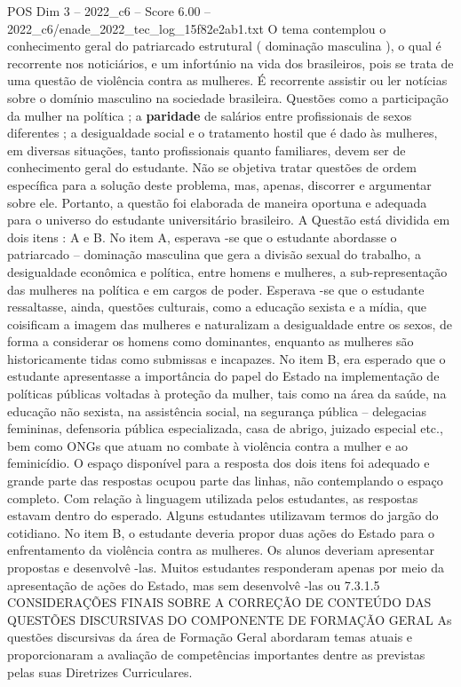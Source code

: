 \begin{textsample}{POS Dim 3 – 2022\_c6 – Score 6.00 – 2022\_c6/enade\_2022\_tec\_log\_15f82e2ab1.txt}
O tema contemplou o conhecimento geral do patriarcado estrutural ( dominação masculina ), o qual é recorrente nos noticiários, e um infortúnio na vida dos brasileiros, pois se trata de uma questão de violência contra as mulheres.
É recorrente assistir ou ler notícias sobre o domínio masculino na sociedade brasileira.
Questões como a participação da mulher na política ; a \textbf{paridade} de salários entre profissionais de sexos diferentes ; a desigualdade social e o tratamento hostil que é dado às mulheres, em diversas situações, tanto profissionais quanto familiares, devem ser de conhecimento geral do estudante.
Não se objetiva tratar questões de ordem específica para a solução deste problema, mas, apenas, discorrer e argumentar sobre ele.
Portanto, a questão foi elaborada de maneira oportuna e adequada para o universo do estudante universitário brasileiro.
A Questão está dividida em dois itens : A e B.
No item A, esperava -se que o estudante abordasse o patriarcado – dominação masculina que gera a divisão sexual do trabalho, a desigualdade econômica e política, entre homens e mulheres, a sub-representação das mulheres na política e em cargos de poder.
Esperava -se que o estudante ressaltasse, ainda, questões culturais, como a educação sexista e a mídia, que coisificam a imagem das mulheres e naturalizam a desigualdade entre os sexos, de forma a considerar os homens como dominantes, enquanto as mulheres são historicamente tidas como submissas e incapazes.
No item B, era esperado que o estudante apresentasse a importância do papel do Estado na implementação de políticas públicas voltadas à proteção da mulher, tais como na área da saúde, na educação não sexista, na assistência social, na segurança pública – delegacias femininas, defensoria pública especializada, casa de abrigo, juizado especial etc., bem como ONGs que atuam no combate à violência contra a mulher e ao feminicídio.
O espaço disponível para a resposta dos dois itens foi adequado e grande parte das respostas ocupou parte das linhas, não contemplando o espaço completo.
Com relação à linguagem utilizada pelos estudantes, as respostas estavam dentro do esperado.
Alguns estudantes utilizavam termos do jargão do cotidiano.
No item B, o estudante deveria propor duas ações do Estado para o enfrentamento da violência contra as mulheres.
Os alunos deveriam apresentar propostas e desenvolvê -las.
Muitos estudantes responderam apenas por meio da apresentação de ações do Estado, mas sem desenvolvê -las ou 7.3.1.5 CONSIDERAÇÕES FINAIS SOBRE A CORREÇÃO DE CONTEÚDO DAS QUESTÕES DISCURSIVAS DO COMPONENTE DE FORMAÇÃO GERAL As questões discursivas da área de Formação Geral abordaram temas atuais e proporcionaram a avaliação de competências importantes dentre as previstas pelas suas Diretrizes Curriculares.

\end{textsample}
